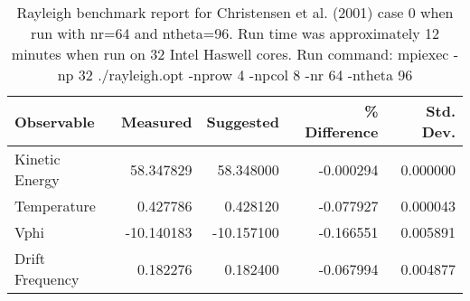 \begin{table}
\centering
\begin{tabular} {| l | r | r | r | r |}
\hline
   Observable      &    Measured    & Suggested   & \% Difference &  Std. Dev. \\
\hline
   Kinetic Energy  &     58.347829  &   58.348000  &   -0.000294  &    0.000000 \\
   Temperature     &      0.427786  &    0.428120  &   -0.077927  &    0.000043 \\
   Vphi            &    -10.140183  &  -10.157100  &   -0.166551  &    0.005891 \\
   Drift Frequency &      0.182276  &    0.182400  &   -0.067994  &    0.004877 \\
\hline
\end{tabular}
\caption{\label{table:bench_high} Rayleigh benchmark report for Christensen et al. (2001) case 0 when run with nr=64 and ntheta=96.  Run time was approximately 12 minutes when run on 32 Intel Haswell cores.  
\newline
Run command:  mpiexec -np 32 ./rayleigh.opt -nprow 4 -npcol 8 -nr 64 -ntheta 96 }
\end{table}
